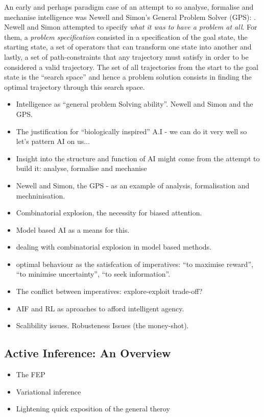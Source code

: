 \documentclass[12pt, twoside]{report}
\begin{document}
An early and perhaps paradigm case of an attempt to so analyse, formalise and mechanise intelligence was Newell and Simon's General Problem Solver (GPS): \textcite{Newell-Simon}.
Newell and Simon attempted to specify \textit{what it was to have a problem at all}. For them, a \textit{problem specification} consisted in a specification of the goal state, the starting state, a set of operators that can transform one state into another and lastly, a set of path-constraints that any trajectory must satisfy in order to be considered a valid trajectory. The set of all trajectories from the start to the goal state is the ``search space'' and hence a problem solution consists in finding the optimal trajectory through this search space.     

\begin{itemize}
\item Intelligence as ``general problem Solving ability''. Newell and Simon and the GPS. 
\item The justification for ``biologically inspired'' A.I - we can do it very well so let's pattern AI on us...
\item Insight into the structure and function of AI might come from the attempt to build it: analyse, formalise and mechanise
\item Newell and Simon, the GPS - as an example of analysis, formalisation and mechninisation. 
\item Combinatorial explosion, the necessity for biased attention.
\item Model based AI as a means for this.
\item dealing with combinatorial explosion in model based methods.
\item optimal behaviour as the satisfcation of imperatives: ``to maximise reward'', ``to minimise uncertainty'', ``to seek information''. 
\item The conflict between imperatives: explore-exploit trade-off?

\item AIF and RL as aproaches to afford intelligent agency.    
\item Scalibility issues. Robusteness Issues (the money-shot).
\end{itemize}


\subsection{Active Inference: An Overview}
\begin{itemize}
\item The FEP
\item Variational inference
\item Lightening quick exposition of the general theroy
\end{itemize}
\end{document}
